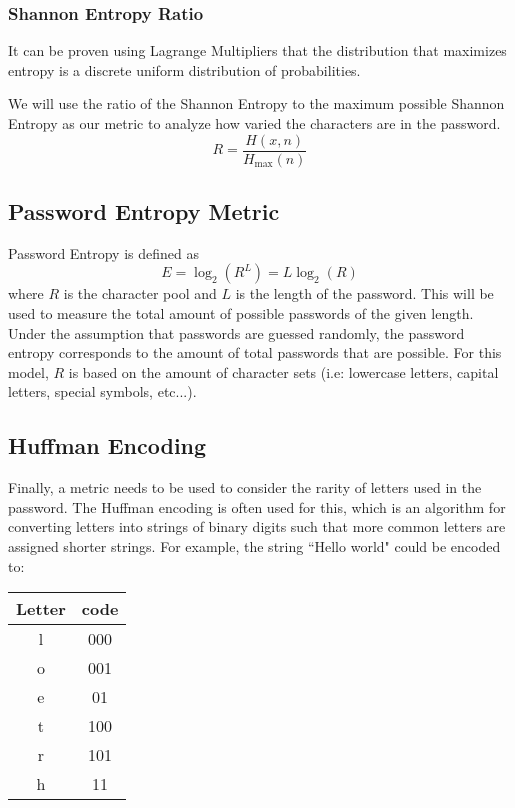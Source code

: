 \documentclass{article}
\begin{document}
\subsubsection{Shannon Entropy Ratio}
It can be proven using Lagrange Multipliers that the distribution that maximizes entropy is a discrete uniform distribution of probabilities. 

We will use the ratio of the Shannon Entropy to the maximum possible Shannon Entropy as our metric to analyze how varied the characters are in the password.
\[
R = \frac{H(x, n)}{H_{\text{max}}(n)}
\]

\subsection{Password Entropy Metric}
Password Entropy is defined as 
\[
E=\log_2(R^L) = L\log_2(R)
\]
where $R$ is the character pool and $L$ is the length of the password.
This will be used to measure the total amount of possible passwords of the given length. Under the assumption that passwords are guessed randomly, the password entropy corresponds to the amount of total passwords that are possible.  
For this model, $R$ is based on the amount of character sets (i.e: lowercase letters, capital letters, special symbols, etc...).


\subsection{Huffman Encoding}

Finally, a metric needs to be used to consider the rarity of letters used in the password. The Huffman encoding is often used for this, which is an algorithm for converting letters into strings of binary digits such that more common letters are assigned shorter strings. For example, the string ``Hello world" could be encoded to:

{
\centering
\begin{tabular}{c|c}
    \centering
    Letter & code\\
    \hline
    l & 000 \\
    o & 001 \\
    e & 01 \\
    t & 100 \\
    r & 101 \\
    h & 11
\end{tabular}\par
}
\end{document}
